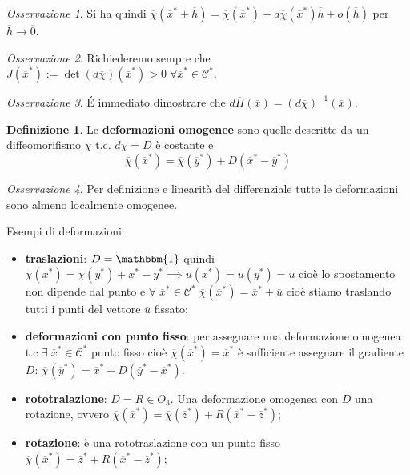\documentclass{book}
\theoremstyle{plain}
\theoremstyle{plain}
\theoremstyle{plain}
\theoremstyle{plain}
\theoremstyle{plain}
\theoremstyle{definition}
\newtheorem{defi}{Definizione}[chapter]
\theoremstyle{remark}
\newtheorem*{oss}{Osservazione}
\theoremstyle{definition}
\begin{document}
\begin{oss}
    Si ha quindi $\overline{\chi}(\overline{x}^*+\overline{h})=\overline{\chi}(\overline{x}^*)+d\overline{\chi}(\overline{x}^*)\overline{h} + o(\overline{h})$ per $\overline{h}\to \overline{0}$.
\end{oss}

\begin{oss}
    Richiederemo sempre che $J(\overline{x}^*):=\det(d\overline{\chi})(\overline{x}^*)>0 \;\forall \overline{x}^* \in \mathcal{C}^*$.
\end{oss}

\begin{oss}
    É immediato dimostrare che $d\overline{\Pi}(\overline{x})=(d\overline{\chi})^{-1}(\overline{x})$.
\end{oss}

\begin{defi}
    Le \textbf{deformazioni omogenee} sono quelle descritte da un diffeomorifismo $\mathcal{\chi}$ t.c. $d\overline{\chi}=D$ è costante e
    \begin{displaymath}
        \overline{\chi}(\overline{x}^*)=\overline{\chi}(\overline{y}^*)+D(\overline{x}^*-\overline{y}^*)
    \end{displaymath}
\end{defi}

\begin{oss}
    Per definizione e linearità del differenziale tutte le deformazioni sono almeno localmente omogenee.
\end{oss}

\noindent Esempi di deformazioni:
\begin{itemize}
    \item \textbf{traslazioni}: $D=\mathbbm{1}$ quindi $\overline{\chi}(\overline{x}^*)=\overline{\chi}(\overline{y}^*)+\overline{x}^*-\overline{y}^* \implies \overline{u}(\overline{x}^*)=\overline{u}(\overline{y}^*)=\overline{u}$ cioè lo spostamento non dipende dal punto e $\forall \; \overline{x}^* \in \mathcal{C}^* \; \overline{\chi}(\overline{x}^*)=\overline{x}^*+\overline{u}$ cioè stiamo traslando tutti i punti del vettore $\overline{u}$ fissato;
    \item \textbf{deformazioni con punto fisso}: per assegnare una deformazione omogenea t.c $\exists\;\overline{x}^*\in\mathcal{C}^*$ punto fisso cioè $\overline{\chi}(\overline{x}^*)=\overline{x}^*$ è sufficiente assegnare il gradiente $D$: $\overline{\chi}(\overline{y}^*)=\overline{x}^*+D(\overline{y}^*-\overline{x}^*)$.
    \item \textbf{rototralazione}: $D=R\in O_3$. Una deformazione omogenea con $D$ una rotazione, ovvero $\overline{\chi}(\overline{x}^*)=\overline{\chi}(\overline{z}^*)+R(\overline{x}^*-\overline{z}^*)$;
    \item \textbf{rotazione}: è una rototraslazione con un punto fisso $\overline{\chi}(\overline{x}^*)=\overline{z}^*+R(\overline{x}^*-\overline{z}^*)$;
\end{itemize}
\end{document}
